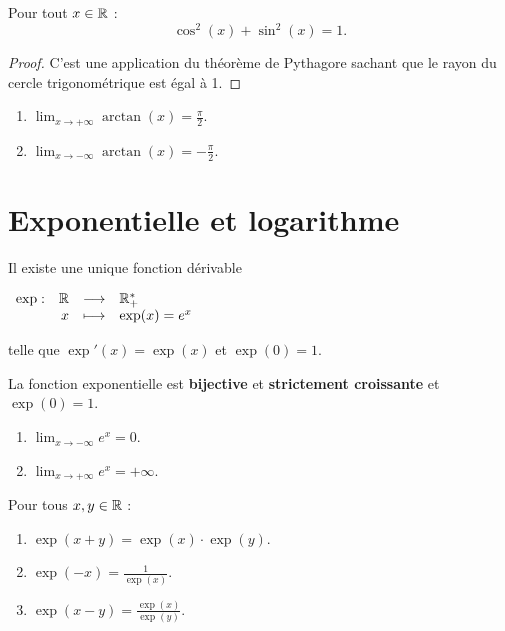 \begin{proposition}
    Pour tout $x \in \mathbb{R}$ :
    \[ \cos^2(x) + \sin^2(x) = 1. \]
\end{proposition}

\begin{proof}
    C'est une application du théorème de Pythagore sachant que le rayon du cercle trigonométrique est égal à 1.
\end{proof}

\begin{proposition}
    \begin{enumerate}
        \item $\lim_{x \to +\infty} \arctan(x) = \frac{\pi}{2}$.
        \item $\lim_{x \to -\infty} \arctan(x) = -\frac{\pi}{2}$.
    \end{enumerate}
\end{proposition}

\section{Exponentielle et logarithme}

\begin{theorem}
	Il existe une unique fonction dérivable 
	\begin{center}
		$
		\begin{array}{rrcl} \exp : & \mathbb{R} & \longrightarrow & \mathbb{R}_+^* \\ & x & \longmapsto & \exp(x) = e^x \end{array}
		$
	\end{center}
	telle que $\exp'(x) = \exp(x)$ et $\exp(0) = 1$.
\end{theorem}

\begin{proposition}
	La fonction exponentielle est \textbf{bijective} et \textbf{strictement croissante} et $\exp(0) = 1$.
    \begin{enumerate}
            \item $\lim_{x \to -\infty} e^x = 0$.
            \item $\lim_{x \to +\infty} e^x = +\infty$.
        \end{enumerate}
    \noindent Pour tous $x, y \in \mathbb{R}$ :
    \begin{enumerate}
            \item $\exp(x + y) = \exp(x) \cdot \exp(y)$.
            \item $\exp(-x) = \frac{1}{\exp(x)}$.
            \item $\exp(x - y) = \frac{\exp(x)}{\exp(y)}$.
        \end{enumerate}
\end{proposition}

